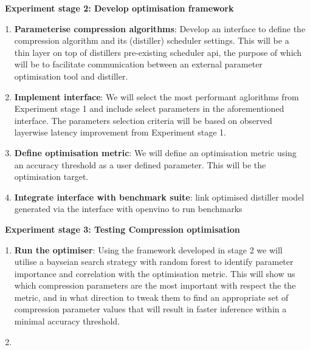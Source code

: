 \documentclass[../../D1.tex]{subfiles}
\begin{document}
\newpage
\textbf{\large~Experiment stage 2: Develop optimisation framework}
\begin{enumerate}
    \item \textbf{Parameterise compression algorithms}: Develop an interface to define the compression algorithm and its (distiller) scheduler settings. This will be a thin layer on top of distillers pre-existing scheduler api, the purpose of which will be to facilitate communication between an external parameter optimisation tool and distiller.
    \item \textbf{Implement interface}: We will select the most performant aglorithms from Experiment stage 1 and include select parameters in the aforementioned interface. The parameters selection criteria will be based on observed layerwise latency improvement from Experiment stage 1.
    \item \textbf{Define optimisation metric}: We will define an optimisation metric using an accuracy threshold as a user defined parameter. This will be the optimisation target.
    \item \textbf{Integrate interface with benchmark suite}: link optimised distiller model generated via the interface with openvino to run benchmarks
\end{enumerate}

\textbf{\large~Experiment stage 3: Testing Compression optimisation}
\begin{enumerate}
    \item \textbf{Run the optimiser}: Using the framework developed in stage 2 we will utilise a bayseian search strategy with random forest to identify parameter importance and correlation with the optimisation metric. This will show us which compression parameters are the most important with respect the the metric, and in what direction to tweak them to find an appropriate set of compression parameter values that will result in faster inference within a minimal accuracy threshold.
    \item 
\end{enumerate}
\end{document}
